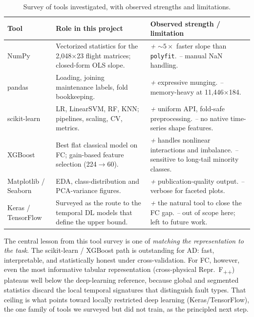 \begin{table}[H]
    \centering
    \caption{Survey of tools investigated, with observed strengths and limitations.}
    \label{tab:tools}
    \begin{tabular}{p{2.4cm} p{4.1cm} p{6.0cm}}
        \toprule
        \textbf{Tool} & \textbf{Role in this project} & \textbf{Observed strength / limitation} \\
        \midrule
        NumPy & Vectorized statistics for the 2{,}048$\times$23 flight matrices; closed-form OLS slope. & {\itshape +} $\sim5\times$ faster slope than \texttt{polyfit}. {\itshape --} manual NaN handling. \\
        \addlinespace
        pandas & Loading, joining maintenance labels, fold bookkeeping. & {\itshape +} expressive munging. {\itshape --} memory-heavy at 11{,}446$\times$184. \\
        \addlinespace
        scikit-learn \cite{sklearn2011} & LR, LinearSVM, RF, KNN; pipelines, scaling, CV, metrics. & {\itshape +} uniform API, fold-safe preprocessing. {\itshape --} no native time-series shape features. \\
        \addlinespace
        XGBoost \cite{xgboost2016} & Best flat classical model on FC; gain-based feature selection (224$\to$60). & {\itshape +} handles nonlinear interactions and imbalance. {\itshape --} sensitive to long-tail minority classes. \\
        \addlinespace
        Matplotlib / Seaborn & EDA, class-distribution and PCA-variance figures. & {\itshape +} publication-quality output. {\itshape --} verbose for faceted plots. \\
        \addlinespace
        Keras / TensorFlow & Surveyed as the route to the temporal DL models that define the upper bound. & {\itshape +} the natural tool to close the FC gap. {\itshape --} out of scope here; left to future work. \\
        \bottomrule
    \end{tabular}
\end{table}

The central lesson from this tool survey is one of \emph{matching the
representation to the task}. The scikit-learn / XGBoost path is outstanding for
AD: fast, interpretable, and statistically honest under cross-validation. For FC,
however, even the most informative tabular representation (cross-physical
Repr.~F\textsubscript{++}) plateaus well below the deep-learning reference,
because global and segmented statistics discard the local temporal signatures
that distinguish fault types. That ceiling is what points toward locally
restricted deep learning (Keras/TensorFlow), the one family of tools we surveyed
but did not train, as the principled next step.

